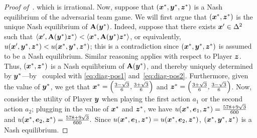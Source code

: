 \begin{proof}[Proof of~]
    which is irrational. Now, suppose that $({\bm{x}}^*, {\bm{y}}^*, {\bm{z}}^*)$ is a Nash equilibrium of the adversarial team game. We will first argue that $({\bm{x}}^*, {\bm{z}}^*)$ is the unique Nash equilibrium of $\mathbf{A}({\bm{y}}^*)$. Indeed, suppose that there exists ${\bm{x}}' \in \Delta^2$ such that $\langle {\bm{x}}', \mathbf{A}({\bm{y}}^*) {\bm{z}}^* \rangle < \langle {\bm{x}}^*, \mathbf{A}({\bm{y}}^*) {\bm{z}}^* \rangle$, or equivalently, $u({\bm{x}}', {\bm{y}}^*, {\bm{z}}^*) < u({\bm{x}}^*, {\bm{y}}^*, {\bm{z}}^*)$; this is a contradiction since $({\bm{x}}^*, {\bm{y}}^*, {\bm{z}}^*)$ is assumed to be a Nash equilibrium. Similar reasoning applies with respect to Player ${\bm{z}}$. Thus, $({\bm{x}}^*, {\bm{z}}^*)$ is a Nash equilibrium of $\mathbf{A}({\bm{y}}^*)$, and thereby uniquely determined by ${\bm{y}}^*$---by~ coupled with \eqref{eq:diag-pos1} and~\eqref{eq:diag-pos2}. Furthermore, given the value of ${\bm{y}}^*$, we get that ${\bm{x}}^* = \left(\frac{3 - \sqrt{3}}{6}, \frac{3 + \sqrt{3}}{6}\right)$ and ${\bm{z}}^* = \left(\frac{3 + \sqrt{3}}{6}, \frac{3 -
    \sqrt{3}}{6}\right)$. Now, consider the utility of Player ${\bm{y}}$ when playing the first action $a_1$ or the second action $a_2$; plugging in the value of ${\bm{x}}^*$ and ${\bm{z}}^*$, we have $u({\bm{x}}^*, {\bm{e}}_1, {\bm{z}}^*) = \frac{578 + 9 \sqrt{3}}{600}$ and $u({\bm{x}}^*, {\bm{e}}_2, {\bm{z}}^*) = \frac{578 + 9 \sqrt{3}}{600}.$ Since $u({\bm{x}}^*, {\bm{e}}_1, {\bm{z}}^*) = u({\bm{x}}^*, {\bm{e}}_2, {\bm{z}}^*)$, $({\bm{x}}^*, {\bm{y}}^*, {\bm{z}}^*)$ is a Nash equilibrium.
    

\end{proof}
